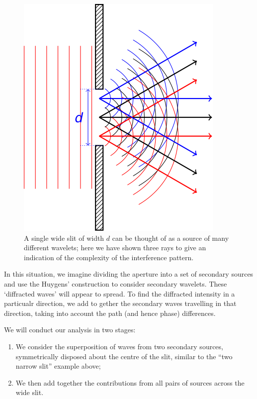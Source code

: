 \documentclass[
]{book}
\providecommand{\tightlist}{%
  \setlength{\itemsep}{0pt}\setlength{\parskip}{0pt}}
\begin{document}
\begin{figure}

{\centering \includegraphics[width=0.7\linewidth]{visualisations/LaTeX/ch13-singlewideslit1} 

}

\caption{A single wide slit of width $d$ can be thought of as a source of many different wavelets; here we have shown three rays to give an indication of the complexity of the interference pattern.}\label{fig:ch13-singlewideslit1}
\end{figure}

In this situation, we imagine dividing the aperture into a set of secondary sources and use the Huygens' construction to consider secondary wavelets. These `diffracted waves' will appear to spread. To find the diffracted intensity in a particualr direction, we add to gether the secondary waves travelling in that direction, taking into account the path (and hence phase) differences.

We will conduct our analysis in two stages:

\begin{enumerate}
\def\labelenumi{\arabic{enumi}.}
\tightlist
\item
  We consider the superposition of waves from two secondary sources, symmetrically disposed about the centre of the slit, similar to the ``two narrow slit'' example above;
\item
  We then add together the contributions from all pairs of sources across the wide slit.
\end{enumerate}
\end{document}
